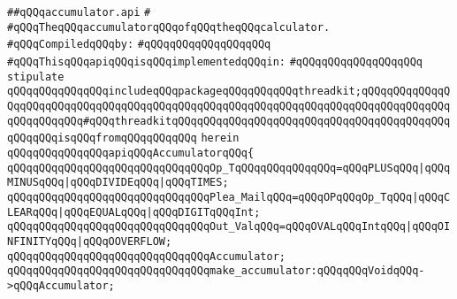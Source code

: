 \label{src/lib/x-kit/tut/calculator/accumulator.api}
\verb|##qQQqaccumulator.api|\newline
\verb|#|\newline
\verb|#qQQqTheqQQqaccumulatorqQQqofqQQqtheqQQqcalculator.|\newline
\newline
\verb|#qQQqCompiledqQQqby:|\newline
\verb|#qQQqqQQqqQQqqQQqqQQq|\newline
\newline
\newline
\verb|#qQQqThisqQQqapiqQQqisqQQqimplementedqQQqin:|\newline
\verb|#qQQqqQQqqQQqqQQqqQQq|\newline
\newline
\verb|stipulate|\newline
\verb|qQQqqQQqqQQqqQQqincludeqQQqpackageqQQqqQQqqQQqthreadkit;qQQqqQQqqQQqqQQqqQQqqQQqqQQqqQQqqQQqqQQqqQQqqQQqqQQqqQQqqQQqqQQqqQQqqQQqqQQqqQQqqQQqqQQqqQQqqQQq#qQQqthreadkitqQQqqQQqqQQqqQQqqQQqqQQqqQQqqQQqqQQqqQQqqQQqqQQqqQQqisqQQqfromqQQqqQQqqQQq|\newline
\verb|herein|\newline
\newline
\verb|qQQqqQQqqQQqqQQqapiqQQqAccumulatorqQQq{|\newline
\newline
\verb|qQQqqQQqqQQqqQQqqQQqqQQqqQQqqQQqOp_TqQQqqQQqqQQqqQQq=qQQqPLUSqQQq|\verb#|qQQqMINUSqQQq|qQQqDIVIDEqQQq|qQQqTIMES;#\newline
\newline
\verb|qQQqqQQqqQQqqQQqqQQqqQQqqQQqqQQqPlea_MailqQQq=qQQqOPqQQqOp_TqQQq|\verb#|qQQqCLEARqQQq|qQQqEQUALqQQq|qQQqDIGITqQQqInt;#\newline
\newline
\verb|qQQqqQQqqQQqqQQqqQQqqQQqqQQqqQQqOut_ValqQQq=qQQqOVALqQQqIntqQQq|\verb#|qQQqOINFINITYqQQq|qQQqOOVERFLOW;#\newline
\newline
\verb|qQQqqQQqqQQqqQQqqQQqqQQqqQQqqQQqAccumulator;|\newline
\newline
\verb|qQQqqQQqqQQqqQQqqQQqqQQqqQQqqQQqmake_accumulator:qQQqqQQqVoidqQQq->qQQqAccumulator;|\newline
